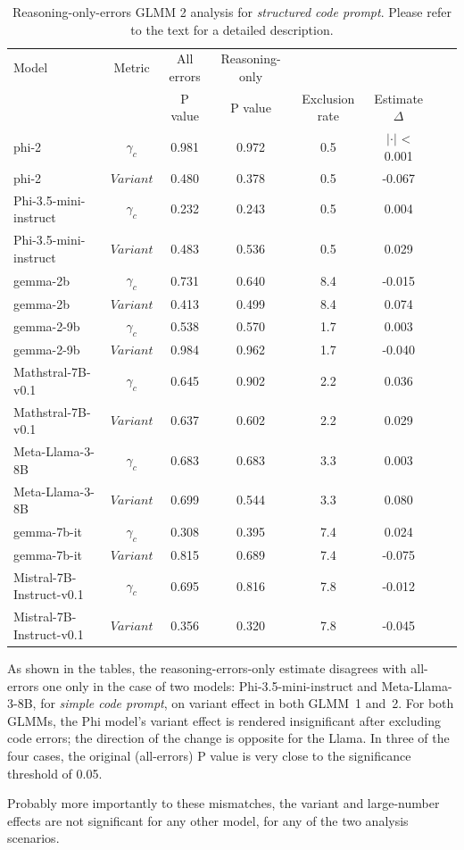 \documentclass[11pt]{article}
\begin{document}
\begin{table}[H]
\small
\centering
\begin{tabular}{lc|cc|cc|cc}
\toprule
Model & Metric & All errors & Reasoning-only & \multicolumn{2}{c}{} \\
 &  & P value & P value & Exclusion rate & Estimate $\Delta$ \\
\midrule
phi-2 & $\gamma_c$ & 0.981 & 0.972 & 0.5 & $|\cdot|$ < 0.001 \\
phi-2 & $Variant$ & 0.480 & 0.378 & 0.5 & -0.067 \\
Phi-3.5-mini-instruct & $\gamma_c$ & 0.232 & 0.243 & 0.5 & 0.004 \\
Phi-3.5-mini-instruct & $Variant$ & 0.483 & 0.536 & 0.5 & 0.029 \\
gemma-2b & $\gamma_c$ & 0.731 & 0.640 & 8.4 & -0.015 \\
gemma-2b & $Variant$ & 0.413 & 0.499 & 8.4 & 0.074 \\
gemma-2-9b & $\gamma_c$ & 0.538 & 0.570 & 1.7 & 0.003 \\
gemma-2-9b & $Variant$ & 0.984 & 0.962 & 1.7 & -0.040 \\
Mathstral-7B-v0.1 & $\gamma_c$ & 0.645 & 0.902 & 2.2 & 0.036 \\
Mathstral-7B-v0.1 & $Variant$ & 0.637 & 0.602 & 2.2 & 0.029 \\
Meta-Llama-3-8B & $\gamma_c$ & 0.683 & 0.683 & 3.3 & 0.003 \\
Meta-Llama-3-8B & $Variant$ & 0.699 & 0.544 & 3.3 & 0.080 \\
gemma-7b-it & $\gamma_c$ & 0.308 & 0.395 & 7.4 & 0.024 \\
gemma-7b-it & $Variant$ & 0.815 & 0.689 & 7.4 & -0.075 \\
Mistral-7B-Instruct-v0.1 & $\gamma_c$ & 0.695 & 0.816 & 7.8 & -0.012 \\
Mistral-7B-Instruct-v0.1 & $Variant$ & 0.356 & 0.320 & 7.8 & -0.045 \\
\bottomrule
\end{tabular}
\caption{Reasoning-only-errors GLMM 2 analysis for \textit{structured code prompt}. Please refer to the text for a detailed description.}
\label{tab:clean-glmm2-long-code}
\end{table}

As shown in the tables, the reasoning-errors-only estimate disagrees with all-errors one only in the case of two models: Phi-3.5-mini-instruct and Meta-Llama-3-8B, for \textit{simple code prompt}, on variant effect in both GLMM~1 and~2. For both GLMMs, the Phi model's variant effect is rendered insignificant after excluding code errors; the direction of the change is opposite for the Llama. In three of the four cases, the original (all-errors) P value is very close to the significance threshold of 0.05. 

Probably more importantly to these mismatches, the variant and large-number effects are not significant for any other model, for any of the two analysis scenarios.
\end{document}
